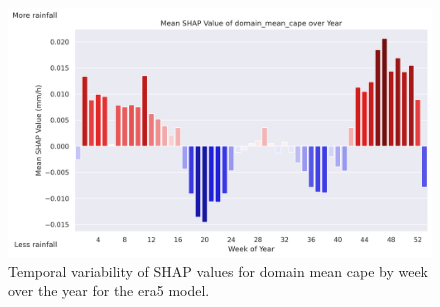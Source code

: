 \begin{figure}[ht]
    \centering
    \includegraphics[width=\textwidth]{../figures/generated/experiments/obs_precipitation/temporal_corr/obs_precipitation_era5_shap_domain_mean_cape_by_week_over_year.png}
    \caption{Temporal variability of SHAP values for domain mean \acrshort{cape} by week over the year for the \acrshort{era5} model.}
    \label{fig:obs_precipitation_era5_shap_domain_mean_cape_by_week_over_year}
\end{figure}